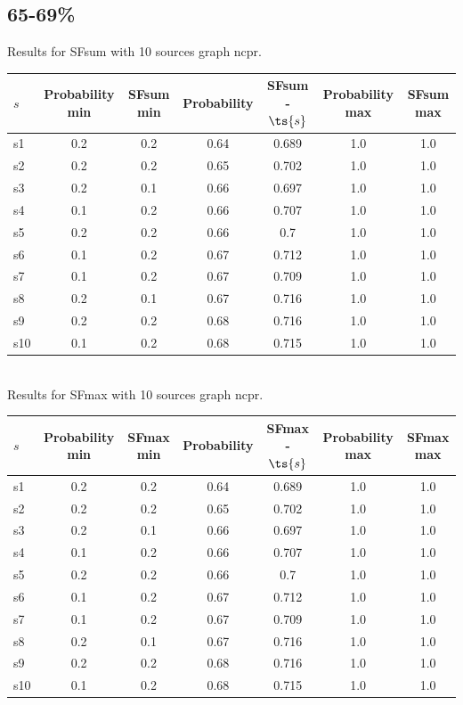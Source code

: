 \documentclass{article}
\begin{document}
\newpage

\subsection{65-69\%}

\noindent Results for SFsum with 10 sources graph ncpr.

\noindent\begin{tabular}{|l|c|c|c|c|c|c|}
\hline
$s$& Probability min & SFsum min & Probability & SFsum - $\ts{s}$ & Probability max & SFsum max\\
\hline
s1 &0.2 & 0.2 & 0.64 & 0.689 & 1.0 & 1.0\\
\hline
s2 &0.2 & 0.2 & 0.65 & 0.702 & 1.0 & 1.0\\
\hline
s3 &0.2 & 0.1 & 0.66 & 0.697 & 1.0 & 1.0\\
\hline
s4 &0.1 & 0.2 & 0.66 & 0.707 & 1.0 & 1.0\\
\hline
s5 &0.2 & 0.2 & 0.66 & 0.7 & 1.0 & 1.0\\
\hline
s6 &0.1 & 0.2 & 0.67 & 0.712 & 1.0 & 1.0\\
\hline
s7 &0.1 & 0.2 & 0.67 & 0.709 & 1.0 & 1.0\\
\hline
s8 &0.2 & 0.1 & 0.67 & 0.716 & 1.0 & 1.0\\
\hline
s9 &0.2 & 0.2 & 0.68 & 0.716 & 1.0 & 1.0\\
\hline
s10 &0.1 & 0.2 & 0.68 & 0.715 & 1.0 & 1.0\\
\hline
\end{tabular}\\

\noindent Results for SFmax with 10 sources graph ncpr.

\noindent\begin{tabular}{|l|c|c|c|c|c|c|}
\hline
$s$& Probability min & SFmax min & Probability & SFmax - $\ts{s}$ & Probability max & SFmax max\\
\hline
s1 &0.2 & 0.2 & 0.64 & 0.689 & 1.0 & 1.0\\
\hline
s2 &0.2 & 0.2 & 0.65 & 0.702 & 1.0 & 1.0\\
\hline
s3 &0.2 & 0.1 & 0.66 & 0.697 & 1.0 & 1.0\\
\hline
s4 &0.1 & 0.2 & 0.66 & 0.707 & 1.0 & 1.0\\
\hline
s5 &0.2 & 0.2 & 0.66 & 0.7 & 1.0 & 1.0\\
\hline
s6 &0.1 & 0.2 & 0.67 & 0.712 & 1.0 & 1.0\\
\hline
s7 &0.1 & 0.2 & 0.67 & 0.709 & 1.0 & 1.0\\
\hline
s8 &0.2 & 0.1 & 0.67 & 0.716 & 1.0 & 1.0\\
\hline
s9 &0.2 & 0.2 & 0.68 & 0.716 & 1.0 & 1.0\\
\hline
s10 &0.1 & 0.2 & 0.68 & 0.715 & 1.0 & 1.0\\
\hline
\end{tabular}\\
\end{document}
